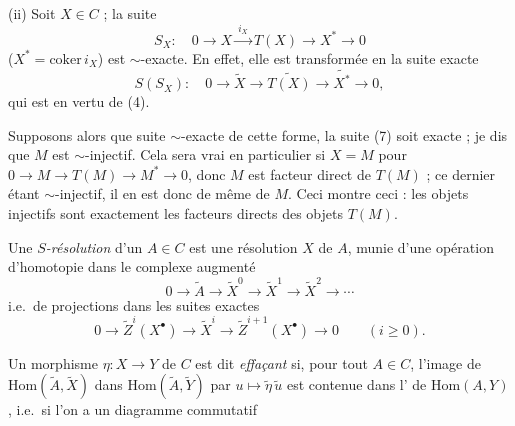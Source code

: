 \documentclass[11pt,a4paper]{article}
\begin{document}
 \ill{}

(ii) Soit $X \in C$ ; la suite
\begin{equation*}
  S_X : \quad 0 \longrightarrow X \xrightarrow{\ i_X\ } T(X)
    \longrightarrow X^{*} \longrightarrow 0
  \tag{8}
\end{equation*}
($X^{*} = \mathrm{coker}\, i_X$) est $\sim$-exacte. En effet, elle est
transformée en la suite exacte
\[
  S(S_X) : \quad 0 \longrightarrow \widetilde{X} \longrightarrow
  \widetilde{T(X)} \longrightarrow \widetilde{X^{*}} \longrightarrow 0 ,
\]
qui est   en vertu de (4).

Supposons alors que   suite $\sim$-exacte de cette forme, la suite (7) soit exacte ; je dis
que $M$ est $\sim$-injectif. Cela sera vrai en particulier si $X = M$ pour
$0 \to M \to T(M) \to M^{*} \to 0$, donc $M$ est facteur direct de $T(M)$ ; ce
dernier étant $\sim$-injectif, il en est donc de même de $M$. Ceci montre
ceci : les objets injectifs sont exactement les facteurs directs des objets
$T(M)$.




Une \emph{$S$-résolution} d'un $A \in C$ est une résolution $X$ de $A$, munie
d'une opération d'homotopie \ill{} dans le complexe augmenté
\[
  0 \longrightarrow \widetilde{A} \longrightarrow \widetilde{X}^{0}
    \longrightarrow \widetilde{X}^{1} \longrightarrow \widetilde{X}^{2}
    \longrightarrow \cdots
\]
i.e.\ de projections  dans les suites exactes
\[
  0 \longrightarrow \widetilde{Z}^{i}(X^{\bullet}) \longrightarrow
  \widetilde{X}^{i} \longrightarrow \widetilde{Z}^{i+1}(X^{\bullet})
  \longrightarrow 0 \qquad (i \geqslant 0).
\]


Un  morphisme $\eta : X \to Y$ de $C$ est dit
\emph{effaçant} si, pour tout $A \in C$, l'image de
$\mathrm{Hom}(\widetilde{A}, \widetilde{X})$ dans
$\mathrm{Hom}(\widetilde{A}, \widetilde{Y})$ par
$u \mapsto \widetilde{\eta}\,\widetilde{u}$ est contenue dans
l' de $\mathrm{Hom}(A, Y)$, i.e.\ si l'on a un diagramme
commutatif
\end{document}
